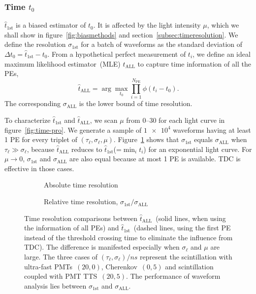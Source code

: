 \subsubsection{Time $t_0$}
\label{sec:time-shift-t_0}

$\hat{t}_\mathrm{1st}$ is a biased estimator of $t_0$.  It is affected by the light intensity $\mu$, which we shall show in figure~\ref{fig:biasmethods} and section~\ref{subsec:timeresolution}. We define the resolution $\sigma_\mathrm{1st}$ for a batch of waveforms as the standard deviation of $\Delta t_0 = \hat{t}_\mathrm{1st} - t_0$. From a hypothetical perfect measurement of $t_i$, we define an ideal maximum likelihood estimator~(MLE) $\hat{t}_\mathrm{ALL}$ to capture time information of all the PEs,
\begin{equation}
  \label{eq:2}
  \hat{t}_\mathrm{ALL} = \arg\underset{t_0}{\max} \prod_{i=1}^{N_\mathrm{PE}} \phi(t_i-t_0).
\end{equation}
The corresponding $\sigma_\mathrm{ALL}$ is the lower bound of time resolution. 

To characterize $\hat{t}_\mathrm{1st}$ and $\hat{t}_\mathrm{ALL}$, we scan $\mu$ from \numrange{0}{30} for each light curve in figure~\ref{fig:time-pro}. We generate a sample of $\num[retain-unity-mantissa=false]{1e4}$ waveforms having at least 1 PE for every triplet of $(\tau_\ell, \sigma_\ell, \mu)$.  Figure~\ref{fig:reso-diff} shows that $\sigma_{\mathrm{1st}}$ equals $\sigma_{\mathrm{ALL}}$ when $\tau_\ell \gg \sigma_\ell$, because $\hat{t}_\mathrm{ALL}$ reduces to $\hat{t}_\mathrm{1st}$(=$\min_i t_i$) for an exponential light curve. For $\mu \to 0$, $\sigma_{\mathrm{1st}}$ and $\sigma_{\mathrm{ALL}}$ are also equal because at most 1 PE is available.  TDC is effective in those cases.

\begin{figure}[H]
  \begin{subfigure}{.49\textwidth}
    \centering
    \resizebox{\textwidth}{!}{}
    \caption{\label{fig:reso-diff} Absolute time resolution}
  \end{subfigure}
  \begin{subfigure}{.49\textwidth}
    \centering
    \resizebox{\textwidth}{!}{}
    \caption{\label{fig:reso-diff-r} Relative time resolution, $\sigma_{\mathrm{1st}}/\sigma_{\mathrm{ALL}}$}
  \end{subfigure}
  \caption{Time resolution comparisons between $\hat{t}_{\mathrm{ALL}}$~(solid lines, when using the information of all PEs) and $\hat{t}_\mathrm{1st}$~(dashed lines, using the first PE instead of the threshold crossing time to eliminate the influence from TDC).  The difference is manifested especially when $\sigma_\ell$ and $\mu$ are large. The three cases of $(\tau_\ell, \sigma_\ell)/\si{ns}$ represent the scintillation with ultra-fast PMTs~$(20, 0)$, Cherenkov~$(0, 5)$ and scintillation coupled with PMT TTS~$(20, 5)$. The performance of waveform analysis lies between $\sigma_{\mathrm{1st}}$ and $\sigma_{\mathrm{ALL}}$. }
\end{figure}

